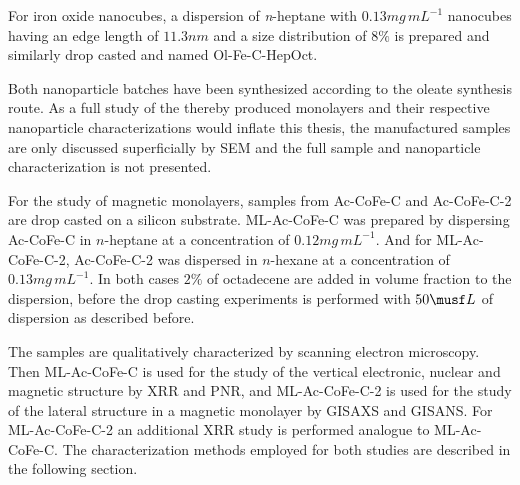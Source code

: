 \documentclass[\main/dresen_thesis.tex]{subfiles}
\begin{document}
      For iron oxide nanocubes, a dispersion of \textit{n}-heptane with $0.13 \unit{mg \, mL^{-1}}$ nanocubes having an edge length of $11.3 \unit{nm}$ and a size distribution of $8\unit{\%}$ is prepared and similarly drop casted and named Ol-Fe-C-HepOct.

      Both nanoparticle batches have been synthesized according to the oleate synthesis route.
      As a full study of the thereby produced monolayers and their respective nanoparticle characterizations would inflate this thesis, the manufactured samples are only discussed superficially by SEM and the full sample and nanoparticle characterization is not presented.

      For the study of magnetic monolayers, samples from Ac-CoFe-C and Ac-CoFe-C-2 are drop casted on a silicon substrate.
      ML-Ac-CoFe-C was prepared by dispersing Ac-CoFe-C in $\mathit{n}$-heptane at a concentration of $0.12 \unit{mg \, mL^{-1}}$.
      And for ML-Ac-CoFe-C-2, Ac-CoFe-C-2 was dispersed in $\mathit{n}$-hexane at a concentration of $0.13 \unit{mg \, mL^{-1}}$.
      In both cases $2 \unit{\%}$ of octadecene are added in volume fraction to the dispersion, before the drop casting experiments is performed with $50 \musf L$ of dispersion as described before.

      The samples are qualitatively characterized by scanning electron microscopy.
      Then ML-Ac-CoFe-C is used for the study of the vertical electronic, nuclear and magnetic structure by XRR and PNR, and ML-Ac-CoFe-C-2 is used for the study of the lateral structure in a magnetic monolayer by GISAXS and GISANS.
      For ML-Ac-CoFe-C-2 an additional XRR study is performed analogue to ML-Ac-CoFe-C.
      The characterization methods employed for both studies are described in the following section.

\end{document}
